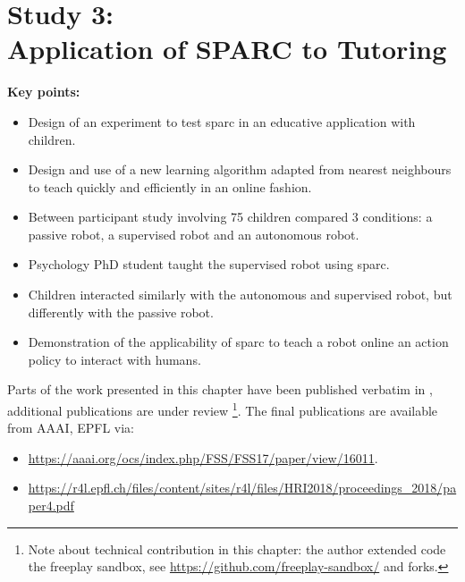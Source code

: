 \chapter[Study 3: Application of SPARC to Tutoring]{Study 3: \\Application of SPARC to Tutoring}\label{chap:tutoring}
\glsresetall
\graphicspath{{images/tutoring/}}

\begin{framed}
	\textbf{Key points:}
	
	\begin{itemize}
		\item Design of an experiment to test \acrshort{sparc} in an educative application with children.
		\item Design and use of a new learning algorithm adapted from nearest neighbours to teach quickly and efficiently in an online fashion.
		\item Between participant study involving 75 children compared 3 conditions: a passive robot, a supervised robot and an autonomous robot.
		\item Psychology PhD student taught the supervised robot using \acrshort{sparc}.
		\item Children interacted similarly with the autonomous and supervised robot, but differently with the passive robot.
		\item Demonstration of the applicability of \acrshort{sparc} to teach a robot online an action policy to interact with humans.
	\end{itemize}
\end{framed}

Parts of the work presented in this chapter have been published verbatim in \cite{senft2017toward}, additional publications are under review \footnote{Note about technical contribution in this chapter: the author extended code the freeplay sandbox, see \url{https://github.com/freeplay-sandbox/} and forks.}. The final publications are available from AAAI, EPFL via:
\begin{itemize}
	\item \url{https://aaai.org/ocs/index.php/FSS/FSS17/paper/view/16011}.
	\item \url{https://r4l.epfl.ch/files/content/sites/r4l/files/HRI2018/proceedings_2018/paper4.pdf}
\end{itemize} 

\newpage

